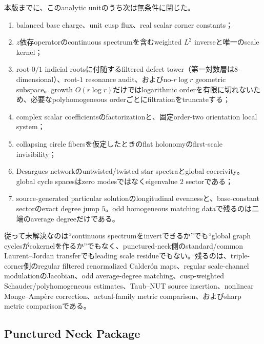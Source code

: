 \documentclass[11pt,a4paper]{ltjsarticle}
\theoremstyle{definition}
\theoremstyle{remark}
\begin{document}
本版までに、このanalytic unitのうち次は無条件に閉じた。
\begin{enumerate}[label=(\alph*),leftmargin=3em]
\item balanced base charge、unit cusp flux、real scalar corner constants；
\item $z$依存operatorのcontinuous spectrumを含むweighted $L^2$ inverseと唯一のscale kernel；
\item root-$0/1$ indicial rootsに付随するfiltered defect tower（第一対数層は8-dimensional）、root-$1$ resonance audit、およびno-$r\log r$ geometric subspace。growth $O(r\log r)$だけではlogarithmic orderを有限に切れないため、必要なpolyhomogeneous orderごとにfiltrationをtruncateする；
\item complex scalar coefficientsのfactorizationと、固定order-two orientation local system；
\item collapsing circle fibersを仮定したときのflat holonomyのfirst-scale invisibility；
\item Desargues networkのuntwisted/twisted star spectraとglobal coercivity。global cycle spacesはzero modesではなくeigenvalue $2$ sectorである；
\item source-generated particular solutionのlongitudinal evennessと、base-constant sectorのexact degree jump $5$。odd homogeneous matching dataで残るのは二端のaverage degreeだけである。
\end{enumerate}
従って未解決なのは``continuous spectrumをinvertできるか''でも``global graph cyclesがcokernelを作るか''でもなく、punctured-neck側のstandard/common Laurent--Jordan transferでもleading scale residueでもない。残るのは、triple-corner側のregular filtered renormalized Calder\'on maps、regular scale-channel modulationのJacobian、odd average-degree matching、cusp-weighted Schauder/polyhomogeneous estimates、Taub--NUT source insertion、nonlinear Monge--Ampère correction、actual-family metric comparison、およびsharp metric comparisonである。

\subsection{Punctured Neck Package}
\end{document}
